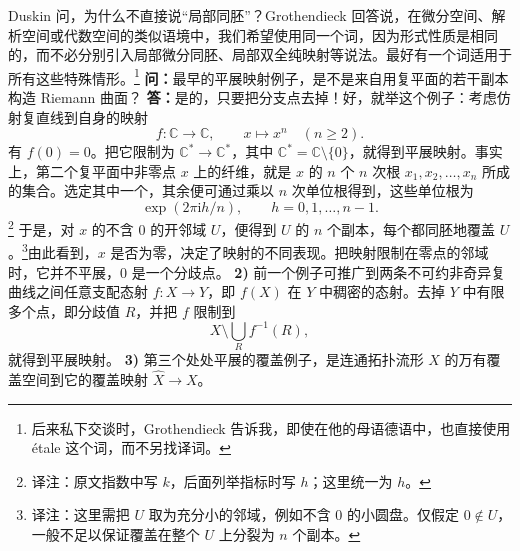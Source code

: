 Duskin 问，为什么不直接说“局部同胚”？Grothendieck 回答说，在微分空间、解析空间或代数空间的类似语境中，我们希望使用同一个词，因为形式性质是相同的，而不必分别引入局部微分同胚、局部双全纯映射等说法。最好有一个词适用于所有这些特殊情形。\footnote{后来私下交谈时，Grothendieck 告诉我，即使在他的母语德语中，也直接使用 étale 这个词，而不另找译词。}
\textbf{问：}最早的平展映射例子，是不是来自用复平面的若干副本构造 Riemann 曲面？
\textbf{答：}是的，只要把分支点去掉！好，就举这个例子：考虑仿射复直线到自身的映射
\[
 f\colon\mathbb C\longrightarrow\mathbb C,
 \qquad x\longmapsto x^n\quad(n\ge2).
\]
有 $f(0)=0$。把它限制为 $\mathbb C^*\to\mathbb C^*$，其中 $\mathbb C^*=\mathbb C\setminus\{0\}$，就得到平展映射。事实上，第二个复平面中非零点 $x$ 上的纤维，就是
$x$ 的 $n$ 个 $n$ 次根 $x_1,x_2,\ldots,x_n$ 所成的集合。选定其中一个，其余便可通过乘以 $n$ 次单位根得到，这些单位根为
\[
 \exp(2\pi\mathrm i h/n),\qquad h=0,1,\ldots,n-1.
\]
\footnote{译注：原文指数中写 $k$，后面列举指标时写 $h$；这里统一为 $h$。}
于是，对 $x$ 的不含 $0$ 的开邻域 $U$，便得到 $U$ 的 $n$ 个副本，每个都同胚地覆盖 $U$。\footnote{译注：这里需把 $U$ 取为充分小的邻域，例如不含 $0$ 的小圆盘。仅假定 $0\notin U$，一般不足以保证覆盖在整个 $U$ 上分裂为 $n$ 个副本。}由此看到，$x$ 是否为零，决定了映射的不同表现。把映射限制在零点的邻域时，它并不平展，$0$ 是一个分歧点。
\textbf{2)} 前一个例子可推广到两条不可约非奇异复曲线之间任意支配态射 $f\colon X\to Y$，即 $f(X)$ 在 $Y$ 中稠密的态射。去掉 $Y$ 中有限多个点，即分歧值 $R$，并把 $f$ 限制到
\[
 X\setminus\bigcup_R f^{-1}(R),
\]
就得到平展映射。
\textbf{3)} 第三个处处平展的覆盖例子，是连通拓扑流形 $X$ 的万有覆盖空间到它的覆盖映射 $\widehat X\to X$。
